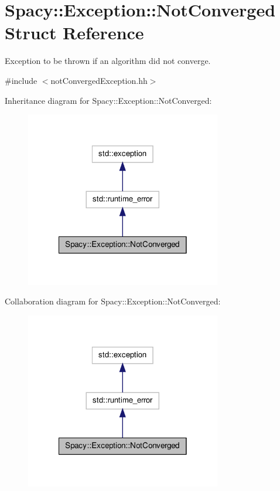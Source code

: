 \hypertarget{structSpacy_1_1Exception_1_1NotConverged}{\section{\-Spacy\-:\-:\-Exception\-:\-:\-Not\-Converged \-Struct \-Reference}
\label{structSpacy_1_1Exception_1_1NotConverged}
}


\-Exception to be thrown if an algorithm did not converge.  




{\ttfamily \#include $<$not\-Converged\-Exception.\-hh$>$}



\-Inheritance diagram for \-Spacy\-:\-:\-Exception\-:\-:\-Not\-Converged\-:
\nopagebreak
\begin{figure}[H]
\begin{center}
\leavevmode
\includegraphics[width=242pt]{structSpacy_1_1Exception_1_1NotConverged__inherit__graph}
\end{center}
\end{figure}


\-Collaboration diagram for \-Spacy\-:\-:\-Exception\-:\-:\-Not\-Converged\-:
\nopagebreak
\begin{figure}[H]
\begin{center}
\leavevmode
\includegraphics[width=242pt]{structSpacy_1_1Exception_1_1NotConverged__coll__graph}
\end{center}
\end{figure}
